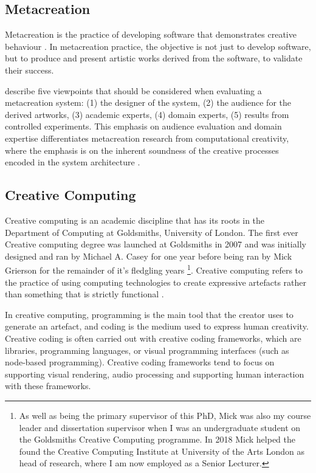 \subsection{Metacreation}

Metacreation is the practice of developing software that demonstrates creative behaviour \citep{whitelaw2004metacreation}. 
In metacreation practice, the objective is not just to develop software, but to produce and present artistic works derived from the software, to validate their success. 

\cite{eigenfeldt2012evaluating} describe five viewpoints that should be considered when evaluating a metacreation system: (1) the designer of the system, (2) the audience for the derived artworks, (3) academic experts, (4) domain experts, (5) results from controlled experiments.
This emphasis on audience evaluation and domain expertise differentiates metacreation research from computational creativity, where the emphasis is on the inherent soundness of the creative processes encoded in the system architecture \citep{colton2008creativity}.

\subsection{Creative Computing}

Creative computing is an academic discipline that has its roots in the Department of Computing at Goldsmiths, University of London. The first ever Creative computing degree was launched at Goldsmiths in 2007 and was initially designed and ran by Michael A. Casey for one year before being ran by Mick Grierson for the remainder of it's fledgling years \footnote{As well as being the primary supervisor of this PhD, Mick was also my course leader and dissertation supervisor when I was an undergraduate student on the Goldsmiths Creative Computing programme. In 2018 Mick helped the found the Creative Computing Institute at University of the Arts London as head of research, where I am now employed as a Senior Lecturer.}. 
Creative computing refers to the practice of using computing technologies to create expressive artefacts rather than something that is strictly functional \citep{yang2016promoting}.

In creative computing, programming is the main tool that the creator uses to generate an artefact, and coding is the medium used to express human creativity. Creative coding is often carried out with creative coding frameworks, which are libraries, programming languages, or visual programming interfaces (such as node-based programming). 
Creative coding frameworks tend to focus on supporting visual rendering, audio processing and supporting human interaction with these frameworks. 

